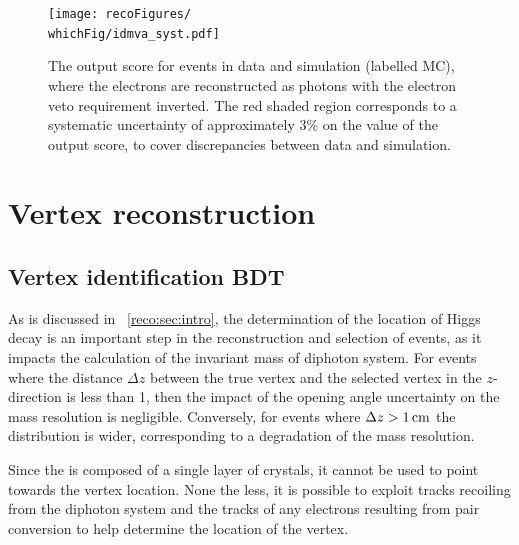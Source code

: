 \begin{figure}[hptb]
\centering 
\texttt{[image: recoFigures/\\whichFig/idmva\_syst.pdf]}
\caption{ The \PhoIdBdt output score for \Zee events in data and simulation (labelled MC), where 
the electrons are reconstructed as photons with the electron veto requirement inverted. The red shaded region corresponds to a systematic uncertainty of approximately 3\% on the value of the output score, to cover discrepancies between data and simulation.}
\label{fig:reco:photon_id_zee_validation}
\end{figure}


\section{Vertex reconstruction}
\label{reco:sec:vertex}

\subsection{Vertex identification BDT}
As is discussed in \Sec~\ref{reco:sec:intro}, the determination of the location of Higgs decay is an important step in the reconstruction and selection of \Hgg events, as it impacts the calculation of the invariant mass of diphoton system. For events where the distance $\Delta z$ between the true vertex and the selected vertex in the $z$-direction is less than 1\cm, then the impact of the opening angle uncertainty on the mass resolution is negligible. Conversely, for events where $\Delta z>1\,\text{cm}$ the \mgg distribution is wider, corresponding to a degradation of the mass resolution. %

Since the \CMS \ECAL is composed of a single layer of crystals, it cannot be used to point towards the vertex location. %
None the less, it is possible to exploit tracks recoiling from the diphoton system and the tracks of any electrons resulting from pair conversion to help determine the location of the vertex.

